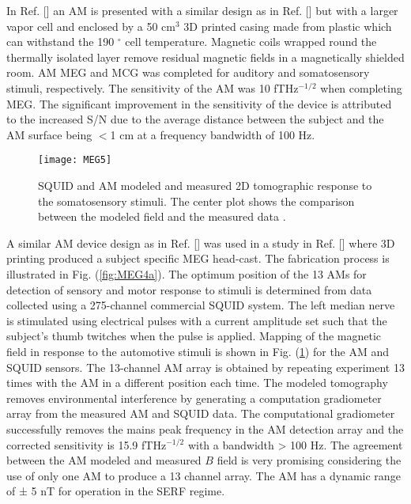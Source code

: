 In Ref. [] an AM is presented with a similar design as in Ref. [] but with a larger vapor cell and enclosed by a 50 cm$^{3}$ 3D printed casing made from plastic which can withstand the 190 $^{\circ}$ cell temperature. Magnetic coils wrapped round the thermally isolated layer remove residual magnetic fields in a magnetically shielded room. AM MEG and MCG was completed for auditory and somatosensory stimuli, respectively. The sensitivity of the AM was 10 fTHz$^{-1/2}$ when completing MEG. The significant improvement in the sensitivity of the device is attributed to the increased S/N due to the average distance between the subject and the AM surface being $<$1 cm at a frequency bandwidth of 100 Hz. 
\begin{figure}[b]
\texttt{[image: MEG5]}
\caption{\label{fig:MEG5} SQUID and AM modeled and measured 2D tomographic response to the somatosensory stimuli. The center plot shows the comparison between the modeled field and the measured data \citep{Boto2017AMagnetometers}.}
\end{figure}
A similar AM device design as in Ref. [] was used in a study in Ref. [] where 3D printing produced a subject specific MEG head-cast. The fabrication process is illustrated in Fig. (\ref{fig:MEG4a}). The optimum position of the 13 AMs for detection of sensory and motor response to stimuli is determined from data collected using a 275-channel commercial SQUID system. The left median nerve is stimulated using electrical pulses with a current amplitude set such that the subject's thumb twitches when the pulse is applied. Mapping of the magnetic field in response to the automotive stimuli is shown in Fig. (\ref{fig:MEG5}) for the AM and SQUID sensors. The 13-channel AM array is obtained by repeating experiment 13 times with the AM in a different position each time. The modeled tomography removes environmental interference by generating a computation gradiometer array from the measured AM and SQUID data. The computational gradiometer successfully removes the mains peak frequency in the AM detection array and the corrected sensitivity is 15.9 fTHz$^{-1/2}$ with a bandwidth > 100 Hz. The agreement between the AM modeled and measured $B$ field is very promising considering the use of only one AM to produce a 13 channel array. The AM has a dynamic range of ± 5 nT for operation in the SERF regime.
